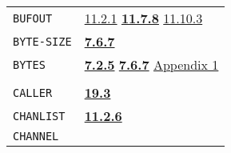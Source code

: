 \documentclass[a4paper,]{article}
\begin{document}
\begin{longtable}[]{@{}ll@{}}
\begin{minipage}[t]{0.24\columnwidth}
\texttt{BUFOUT}\strut
\end{minipage} & \begin{minipage}[t]{0.70\columnwidth}\raggedright\strut
\href{11-input-output.md\#1121-open}{11.2.1} \textbf{\href{11-input-output.md\#1178-bufout}{11.7.8}}
\href{11-input-output.md\#11103-nets}{11.10.3}\strut
\end{minipage}\tabularnewline
\begin{minipage}[t]{0.24\columnwidth}\raggedright\strut
\texttt{BYTE-SIZE}\strut
\end{minipage} & \begin{minipage}[t]{0.70\columnwidth}\raggedright\strut
\textbf{\href{07-structured-objects.md\#767-bytes}{7.6.7}}\strut
\end{minipage}\tabularnewline
\begin{minipage}[t]{0.24\columnwidth}\raggedright\strut
\texttt{BYTES}\strut
\end{minipage} & \begin{minipage}[t]{0.70\columnwidth}\raggedright\strut
\textbf{\href{07-structured-objects.md\#725-bytes}{7.2.5}} \textbf{\href{07-structured-objects.md\#767-bytes}{7.6.7}}
\href{appendix-1-a-look-inside.md\#appendix-1-a-look-inside}{Appendix 1}\strut
\end{minipage}\tabularnewline
\begin{minipage}[t]{0.24\columnwidth}\raggedright\strut
\strut
\end{minipage} & \begin{minipage}[t]{0.70\columnwidth}\raggedright\strut
\strut
\end{minipage}\tabularnewline
\begin{minipage}[t]{0.24\columnwidth}\raggedright\strut
\texttt{CALLER}\strut
\end{minipage} & \begin{minipage}[t]{0.70\columnwidth}\raggedright\strut
\textbf{\href{19-compiled-programs.md\#193-rsubr-linking}{19.3}}\strut
\end{minipage}\tabularnewline
\begin{minipage}[t]{0.24\columnwidth}\raggedright\strut
\texttt{CHANLIST}\strut
\end{minipage} & \begin{minipage}[t]{0.70\columnwidth}\raggedright\strut
\textbf{\href{11-input-output.md\#1126-chanlist}{11.2.6}}\strut
\end{minipage}\tabularnewline
\begin{minipage}[t]{0.24\columnwidth}\raggedright\strut
\texttt{CHANNEL}\strut

\end{minipage}
\end{longtable}
\end{document}

